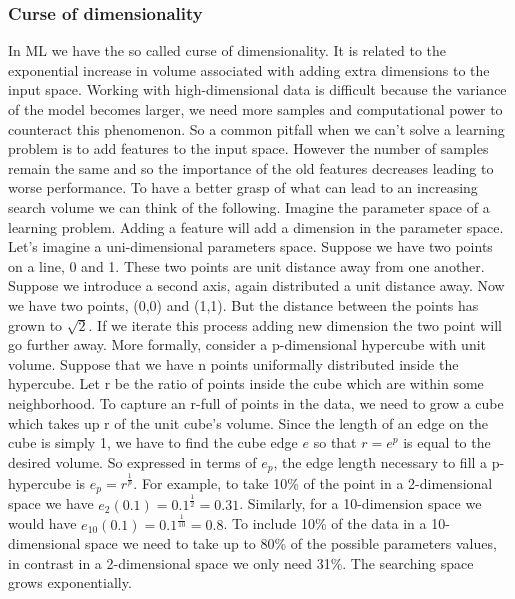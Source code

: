\documentclass[../main.tex]{subfiles}
\begin{document}
\subsubsection{Curse of dimensionality} In ML we have the so called curse of dimensionality. It is related to the exponential increase in volume associated with adding extra dimensions to the input space. Working with high-dimensional data is difficult because the variance of the model becomes larger, we need more samples and computational power to counteract this phenomenon. So a common pitfall when we can't solve a learning problem is to add features to the input space. However the number of samples remain the same and so the importance of the old features decreases leading to worse performance. To have a better grasp of what can lead to an increasing search volume we can think of the following. Imagine the parameter space of a learning problem. Adding a feature will add a dimension in the parameter space. Let's imagine a uni-dimensional parameters space. Suppose we have two points on a line, 0 and 1. These two points are unit distance away from one another. Suppose we introduce a second axis, again distributed a unit distance away. Now we have two points, (0,0) and (1,1). But the distance between the points has grown to $\sqrt{2}$. If we iterate this process adding new dimension the two point will go further away. More formally, consider a p-dimensional hypercube with unit volume. Suppose that we have n points uniformally distributed inside the hypercube. Let r be the ratio of points inside the cube which are within some neighborhood. To capture an r-full of points in the data, we need to grow a cube which takes up r of the unit cube's volume. Since the length of an edge on the cube is simply 1, we have to find the cube edge $e$ so that $r=e^p$ is equal to the desired volume.
So expressed in terms of $e_p$, the edge length necessary to fill a p-hypercube is $e_p=r^{\frac{1}{p}}$. For example, to take 10\% of the point in a 2-dimensional space we have $e_2(0.1)=0.1^{\frac{1}{2}}=0.31$. Similarly, for a 10-dimension space we would have $e_{10}(0.1)=0.1^{\frac{1}{10}}=0.8$. To include 10\% of the data in a 10-dimensional space we need to take up to 80\% of the possible parameters values, in contrast in a 2-dimensional space we only need 31\%. The searching space grows exponentially.
\end{document}
